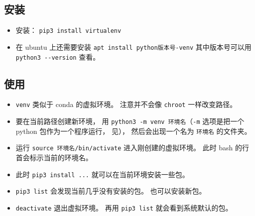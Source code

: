 
\begin{issues}
\issueDraft
\end{issues}


\subsection{安装}
\begin{itemize}
\item 安装： \verb|pip3 install virtualenv|
\item 在 ubuntu 上还需要安装 \verb|apt install python版本号-venv| 其中版本号可以用 \verb|python3 --version| 查看。
\end{itemize}

\subsection{使用}
\begin{itemize}
\item \verb|venv| 类似于 conda 的虚拟环境。 注意并不会像 \verb|chroot| 一样改变路径。
\item 要在当前路径创建新环境， 用 \verb|python3 -m venv 环境名|（\verb|-m| 选项是把一个 python 包作为一个程序运行， 见）， 然后会出现一个名为 \verb|环境名| 的文件夹。
\item 运行 \verb|source 环境名/bin/activate| 进入刚创建的虚拟环境。 此时 bash 的行首会标示当前的环境名。
\item 此时 \verb|pip3 install ...| 就可以在当前环境安装一些包。
\item \verb|pip3 list| 会发现当前几乎没有安装的包。 也可以安装新包。
\item \verb|deactivate| 退出虚拟环境。 再用 \verb|pip3 list| 就会看到系统默认的包。
\end{itemize}
